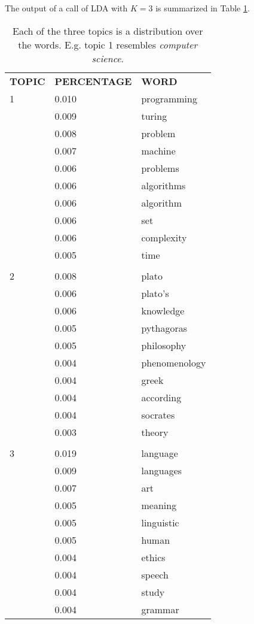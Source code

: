 \documentclass[a4paper,ngerman]{atseminar}
\begin{document}
\vspace{1.3cm}

                               
The output of a call of LDA with $K=3$ is summarized in Table \ref{table:lda_output}.


\begin{table}[h!]
\caption{Each of the three topics is a distribution over the words. E.g. topic 1 resembles \textit{computer science}.}
\label{table:lda_output}
\begin{tabular}{l l l}
\textbf{TOPIC} & \textbf{PERCENTAGE} & \textbf{WORD} \\

1  &   0.010 & programming  \\
    &   0.009 & turing \\
    &   0.008 & problem \\
    &   0.007 & machine \\
    &   0.006 & problems \\
    &   0.006 & algorithms\\
    &   0.006 & algorithm  \\
    &   0.006 & set \\
    &   0.006 & complexity \\ 
    &   0.005 & time  \\
 \hline \\
 2 &  0.008 & plato \\
    &  0.006 & plato's  \\
    &  0.006 & knowledge \\ 
    &  0.005 & pythagoras \\
    &  0.005 & philosophy  \\
    &  0.004 & phenomenology \\
    &  0.004 & greek  \\
    &  0.004 & according  \\ 
    &  0.004 & socrates  \\
    &  0.003 & theory \\
  \hline \\
3 & 0.019 & language \\
   & 0.009 & languages  \\
   & 0.007 & art \\
   & 0.005 & meaning \\ 
   & 0.005 & linguistic \\
   & 0.005 & human \\
   & 0.004 & ethics \\
   & 0.004 & speech \\
   & 0.004 & study \\
   & 0.004 & grammar 
\end{tabular}
\end{table}
\end{document}
